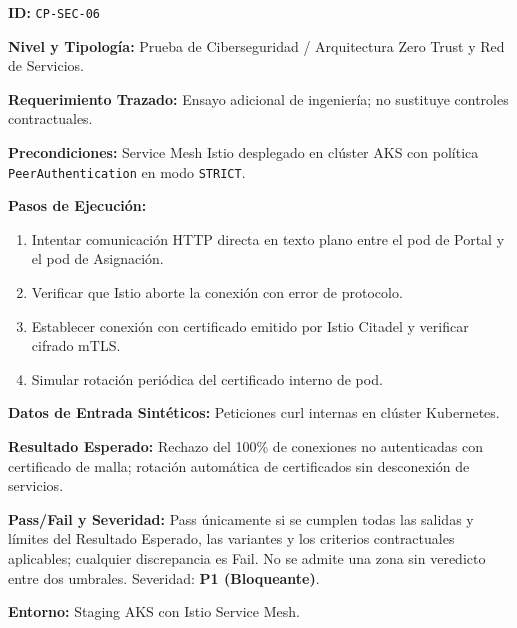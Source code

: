 \par\noindent\textbf{ID:} \texttt{C\allowbreak{}P\allowbreak{}-\allowbreak{}S\allowbreak{}E\allowbreak{}C\allowbreak{}-\allowbreak{}0\allowbreak{}6\allowbreak{}}\par
\par\noindent\textbf{Nivel y Tipología:} Prueba de Ciberseguridad / Arquitectura Zero Trust y Red de Servicios.\par
\par\noindent\textbf{Requerimiento Trazado:} Ensayo adicional de ingeniería; no sustituye controles contractuales.\par
\par\noindent\textbf{Precondiciones:} Service Mesh Istio desplegado en clúster AKS con política \texttt{P\allowbreak{}e\allowbreak{}e\allowbreak{}r\allowbreak{}A\allowbreak{}u\allowbreak{}t\allowbreak{}h\allowbreak{}e\allowbreak{}n\allowbreak{}t\allowbreak{}i\allowbreak{}c\allowbreak{}a\allowbreak{}t\allowbreak{}i\allowbreak{}o\allowbreak{}n\allowbreak{}} en modo \texttt{S\allowbreak{}T\allowbreak{}R\allowbreak{}I\allowbreak{}C\allowbreak{}T\allowbreak{}}.\par
\par\noindent\textbf{Pasos de Ejecución:} \par
\begin{enumerate}
\item Intentar comunicación HTTP directa en texto plano entre el pod de Portal y el pod de Asignación.
\item Verificar que Istio aborte la conexión con error de protocolo.
\item Establecer conexión con certificado emitido por Istio Citadel y verificar cifrado mTLS.
\item Simular rotación periódica del certificado interno de pod.
\end{enumerate}
\par\noindent\textbf{Datos de Entrada Sintéticos:} Peticiones curl internas en clúster Kubernetes.\par
\par\noindent\textbf{Resultado Esperado:} Rechazo del 100\% de conexiones no autenticadas con certificado de malla; rotación automática de certificados sin desconexión de servicios.\par
\par\noindent\textbf{Pass/Fail y Severidad:} Pass únicamente si se cumplen todas las salidas y límites del Resultado Esperado, las variantes y los criterios contractuales aplicables; cualquier discrepancia es Fail. No se admite una zona sin veredicto entre dos umbrales. Severidad: \textbf{P1 (Bloqueante)}.\par
\par\noindent\textbf{Entorno:} Staging AKS con Istio Service Mesh.\par






